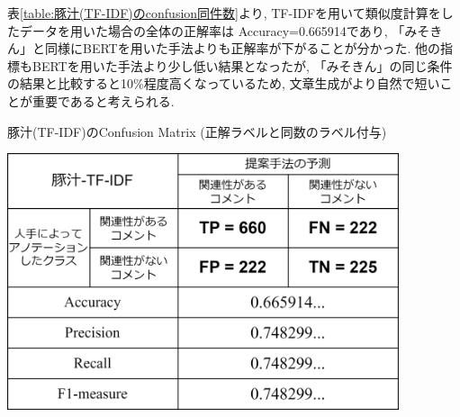 \documentclass{ltjarticle}
\begin{document}
表\ref{table:豚汁(TF-IDF)のconfusion同件数}より, TF-IDFを用いて類似度計算をしたデータを用いた場合の全体の正解率は
Accuracy=0.665914であり, 「みそきん」と同様にBERTを用いた手法よりも正解率が下がることが分かった. 
他の指標もBERTを用いた手法より少し低い結果となったが, 「みそきん」の同じ条件の結果と比較すると10\%程度高くなっているため, 
文章生成がより自然で短いことが重要であると考えられる. 
\begin{table}[ht]
    \centering
    \caption{豚汁(TF-IDF)のConfusion Matrix (正解ラベルと同数のラベル付与)}
    \vspace{5truept}

    \includegraphics[width = 11.5cm]{images/豚汁images/豚汁Confusion_TF-IDF同件数.drawio.png}
    \label{table:豚汁(TF-IDF)のconfusion同件数}
\end{table}
\end{document}
